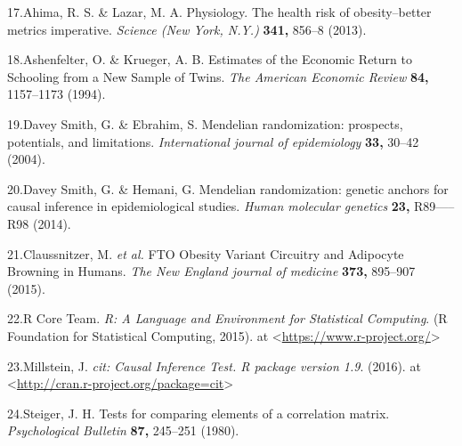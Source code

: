 \documentclass[]{article}
\begin{document}
17.Ahima, R. S. \& Lazar, M. A. Physiology. The health risk of
obesity--better metrics imperative. \emph{Science (New York, N.Y.)}
\textbf{341,} 856--8 (2013).

18.Ashenfelter, O. \& Krueger, A. B. Estimates of the Economic Return to
Schooling from a New Sample of Twins. \emph{The American Economic
Review} \textbf{84,} 1157--1173 (1994).

19.{Davey Smith}, G. \& Ebrahim, S. Mendelian randomization: prospects,
potentials, and limitations. \emph{International journal of
epidemiology} \textbf{33,} 30--42 (2004).

20.{Davey Smith}, G. \& Hemani, G. Mendelian randomization: genetic
anchors for causal inference in epidemiological studies. \emph{Human
molecular genetics} \textbf{23,} R89-----R98 (2014).

21.Claussnitzer, M. \emph{et al.} FTO Obesity Variant Circuitry and
Adipocyte Browning in Humans. \emph{The New England journal of medicine}
\textbf{373,} 895--907 (2015).

22.R Core Team. \emph{R: A Language and Environment for Statistical
Computing}. (R Foundation for Statistical Computing, 2015). at
\textless{}\url{https://www.r-project.org/}\textgreater{}

23.Millstein, J. \emph{cit: Causal Inference Test. R package version
1.9}. (2016). at
\textless{}\url{http://cran.r-project.org/package=cit}\textgreater{}

24.Steiger, J. H. Tests for comparing elements of a correlation matrix.
\emph{Psychological Bulletin} \textbf{87,} 245--251 (1980).
\end{document}
